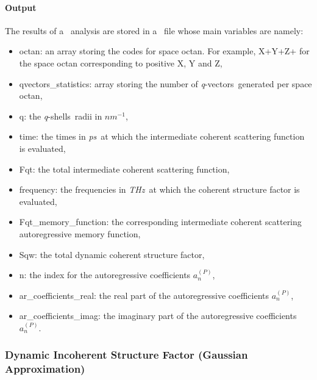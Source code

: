 \documentclass[a4paper,11pt]{report}
\newcommand{\ps}{\textit{ps}}
\newcommand{\invnm}{$nm^{-1}$}
\newcommand{\thz}{\textit{THz}}
\newcommand{\qvects}{\textit{q}-vectors}
\newcommand{\qshells}{\textit{q}-shells}
\begin{document}
\paragraph{Output\\}
The results of a \DISFAR\ analysis are stored in a \NetCDF\ file whose main variables are namely:
\begin{itemize}
\item octan: an array storing the codes for space octan. For example, X+Y+Z+ for the space octan corresponding to positive
X, Y and Z,
\item qvectors\_statistics: array storing the number of \qvects\ generated per space octan,
\item q: the \qshells\ radii in \invnm ,
\item time: the times in \ps\ at which the intermediate coherent scattering function is evaluated,
\item Fqt: the total intermediate coherent scattering function,
\item frequency: the frequencies in \thz\ at which the coherent structure factor is evaluated,
\item Fqt\_memory\_function: the corresponding intermediate coherent scattering autoregressive memory function,
\item Sqw: the total dynamic coherent structure factor,
\item n: the index for the autoregressive coefficients $a_n^{(P)}$,
\item ar\_coefficients\_real: the real part of the autoregressive coefficients $a_n^{(P)}$,
\item ar\_coefficients\_imag: the imaginary part of the autoregressive coefficients $a_n^{(P)}$.
\end{itemize}

\subsubsection{Dynamic Incoherent Structure Factor (Gaussian Approximation)}
\label{disfg}
\end{document}
